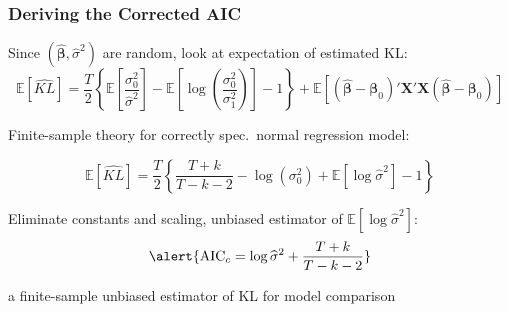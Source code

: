 \begin{frame}
  \frametitle{Deriving the Corrected AIC} 
  Since $(\widehat{\boldsymbol{\beta}}, \widehat{\sigma}^2)$ are random, look at \alert{expectation of estimated KL}:
  \small
      \[
        \mathbb{E}[\widehat{KL}] = \frac{T}{2}\left\{ \mathbb{E}\left[\frac{\sigma_0^2}{\widehat{\sigma}^2}\right] - \mathbb{E}\left[\log \left( \frac{\sigma_0^2}{\sigma_1^2} \right)\right] - 1\right\} + \mathbb{E}\left[ (\widehat{\boldsymbol{\beta}} - \boldsymbol{\beta}_0)' \mathbf{X}'\mathbf{X} (\widehat{\boldsymbol{\beta}} - \boldsymbol{\beta}_0)\right]
      \]

      \pause

      \normalsize
      \vspace{1em}
  Finite-sample theory for correctly spec.\ normal regression model:

  \[
    \mathbb{E}\left[ \widehat{KL} \right] = \frac{T}{2}\left\{ \frac{T + k}{T-k-2} - \log(\sigma_0^2) + \mathbb{E}[\log \widehat{\sigma}^2 ] - 1\right\}
  \]
   
  \pause

  \vspace{1em}
  Eliminate constants and scaling, unbiased estimator of $\mathbb{E}[\log \widehat{\sigma}^2]$:
  \vspace{-0.5em}
 \[
   \alert{\text{AIC}_c = \log \widehat{\sigma}^2 + \frac{T+k}{T-k-2}}
 \]

  \vspace{-0.5em}
  a finite-sample unbiased estimator of KL for model comparison

\end{frame}
